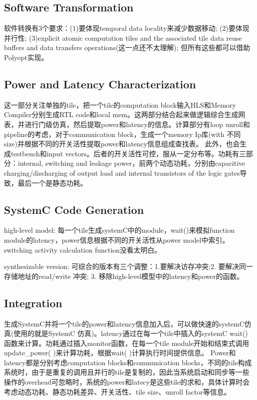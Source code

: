 \documentclass[UTF8]{scrartcl}
\begin{document}
	\subsection{Software Transformation}
		
		软件转换有3个要求：(1)要体现temporal data locality来减少数据移动; (2)要体现并行性; (3)explicit atomic computation tiles and the associated tile data reuse buffers and data transfers operations(这一点还不太理解); 但所有这些都可以借助Polyopt实现。
		
	\subsection{Power and Latency Characterization}
	
		这一部分关注单独的tile，把一个tile的computation block输入HLS和Memory Compiler分别生成RTL code和local mem。这两部分结合起来做逻辑综合生成网表，并进行门级仿真，然后提取power和latency的信息。计算部分有loop unroll和pipeline的考虑，对于communication block，生成一个memory Ip库(with 不同size)并根据不同的开关活性提取power和latency信息组成查找表。
		此外，也会生成testbench和input vectors。后者的开关活性可控，服从一定分布等。功耗有三部分：internal, switching and leakage power，前两个动态功耗，分别由capacitive charging/discharging of output load and internal transistors of the logic gates导致，最后一个是静态功耗。
	
	\subsection{SystemC Code Generation}
	
		high-level model: 每一个tile生成systemC中的module，wait()来模拟function module的latency，power信息根据不同的开关活性从power model中索引。switching activity calculation function没看太明白。
		
		synthesizable version: 可综合的版本有三个调整：1.要解决访存冲突;2. 要解决同一存储地址的read/write 冲突; 3. 移除high-level模型中的latency和power的函数。
	
	\subsection{Integration}
		
		生成SystemC并将一个tile的power和latency信息加入后，可以做快速的systemC仿真(使用的就是SystemC 仿真)。latency通过在每一个tile中插入的systemC wait()函数来计算。功耗通过插入monitor函数，在每一个tile module开始和结束式调用update\_power( )来计算功耗，根据wait( )计算执行时间提供信息。 Power和latency都是分别考虑computation blocks和communication blocks，不同的tile构成系统时，由于是重复的调用且并行的tile是复制的，因此当系统启动和同步等一些操作的overhead可忽略时，系统的power和latecy是这些tile的求和，具体计算时会考虑动态功耗、静态功耗差异、开关活性、tile size、unroll factor等信息。
\end{document}
